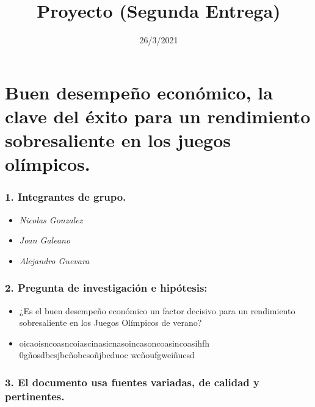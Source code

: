 \documentclass[
]{article}
\title{Proyecto (Segunda Entrega)}
\author{}
\date{\vspace{-2.5em}26/3/2021}
\begin{document}
\maketitle

\hypertarget{buen-desempeuxf1o-econuxf3mico-la-clave-del-uxe9xito-para-un-rendimiento-sobresaliente-en-los-juegos-oluxedmpicos.}{%
\section{\texorpdfstring{\textbf{Buen desempeño económico, la clave del
éxito para un rendimiento sobresaliente en los juegos
olímpicos.}}{Buen desempeño económico, la clave del éxito para un rendimiento sobresaliente en los juegos olímpicos.}}\label{buen-desempeuxf1o-econuxf3mico-la-clave-del-uxe9xito-para-un-rendimiento-sobresaliente-en-los-juegos-oluxedmpicos.}}

\hypertarget{integrantes-de-grupo.}{%
\subsubsection{\texorpdfstring{\textbf{1.} Integrantes de
grupo.}{1. Integrantes de grupo.}}\label{integrantes-de-grupo.}}

\begin{itemize}
\item
  \emph{Nicolas Gonzalez}
\item
  \emph{Joan Galeano}
\item
  \emph{Alejandro Guevara}
\end{itemize}

\hypertarget{pregunta-de-investigaciuxf3n-e-hipuxf3tesis}{%
\subsubsection{\texorpdfstring{\textbf{2.} Pregunta de investigación e
hipótesis:}{2. Pregunta de investigación e hipótesis:}}\label{pregunta-de-investigaciuxf3n-e-hipuxf3tesis}}

\begin{itemize}
\item
  ¿Es el buen desempeño económico un factor decisivo para un rendimiento
  sobresaliente en los Juegos Olímpicos de verano?
\item
  oicaoisncoasncoiascinasicnasoincasoncoasincoasihfh
  0gñosdbcsjbcñobcsoñjbcduoc weñoufgweiñucsd
\end{itemize}

\hypertarget{el-documento-usa-fuentes-variadas-de-calidad-y-pertinentes.}{%
\subsubsection{\texorpdfstring{\textbf{3.} El documento usa fuentes
variadas, de calidad y
pertinentes.}{3. El documento usa fuentes variadas, de calidad y pertinentes.}}\label{el-documento-usa-fuentes-variadas-de-calidad-y-pertinentes.}}
\end{document}
